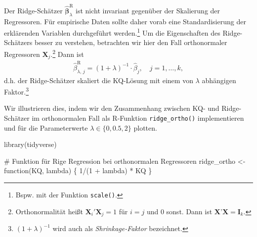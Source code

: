 \documentclass[
  a4paper,
  DIV=11,
  oneside]{scrreprt}
\newenvironment{Shaded}{\begin{snugshade}}{\end{snugshade}}
\newcommand{\CommentTok}[1]{\textcolor[rgb]{0.37,0.37,0.37}{#1}}
\newcommand{\ControlFlowTok}[1]{\textcolor[rgb]{0.00,0.23,0.31}{#1}}
\newcommand{\DecValTok}[1]{\textcolor[rgb]{0.68,0.00,0.00}{#1}}
\newcommand{\FunctionTok}[1]{\textcolor[rgb]{0.28,0.35,0.67}{#1}}
\newcommand{\NormalTok}[1]{\textcolor[rgb]{0.00,0.23,0.31}{#1}}
\newcommand{\OtherTok}[1]{\textcolor[rgb]{0.00,0.23,0.31}{#1}}
\newcommand{\SpecialCharTok}[1]{\textcolor[rgb]{0.37,0.37,0.37}{#1}}
\begin{document}
Der Ridge-Schätzer \(\widehat{\boldsymbol{\beta}}^{\mathrm{R}}_\lambda\)
ist nicht invariant gegenüber der Skalierung der Regressoren. Für
empirische Daten sollte daher vorab eine Standardisierung der
erklärenden Variablen durchgeführt werden.\footnote{Bspw. mit der
  Funktion \texttt{scale()}.} Um die Eigenschaften des Ridge-Schätzers
besser zu verstehen, betrachten wir hier den Fall orthonormaler
Regressoren \(\boldsymbol{X}_j\).\footnote{Orthonormalität heißt
  \(\boldsymbol{X}_i'\boldsymbol{X}_j = 1\) für \(i=j\) und \(0\) sonst.
  Dann ist \(\boldsymbol{X}\)'\(\boldsymbol{X} = \boldsymbol{I}_k\).}
Dann ist \begin{align}
  \widehat{\beta}^{\mathrm{R}}_{\lambda,\,j} = (1+\lambda)^{-1} \cdot\widehat{\beta}_j,\quad j = 1,\dots,k,\label{eq:ridgeortho}
\end{align} d.h. der Ridge-Schätzer skaliert die KQ-Lösung mit einem von
\(\lambda\) abhängigen Faktor.\footnote{\((1+\lambda)^{-1}\) wird auch
  als \emph{Shrinkage-Faktor} bezeichnet.}

Wir illustrieren dies, indem wir den Zusammenhang zwischen KQ- und
Ridge-Schätzer im orthonormalen Fall als R-Funktion
\texttt{ridge\_ortho()} implementieren und für die Parameterwerte
\(\lambda\in\{0,0.5,2\}\) plotten.

\begin{Shaded}
\begin{Highlighting}[]
\FunctionTok{library}\NormalTok{(tidyverse)}

\CommentTok{\# Funktion für Rige Regression bei orthonormalen Regressoren}
\NormalTok{ridge\_ortho }\OtherTok{\textless{}{-}} \ControlFlowTok{function}\NormalTok{(KQ, lambda) \{}
  \DecValTok{1}\SpecialCharTok{/}\NormalTok{(}\DecValTok{1} \SpecialCharTok{+}\NormalTok{ lambda) }\SpecialCharTok{*}\NormalTok{ KQ}
\NormalTok{\}}
\end{Highlighting}
\end{Shaded}
\end{document}
